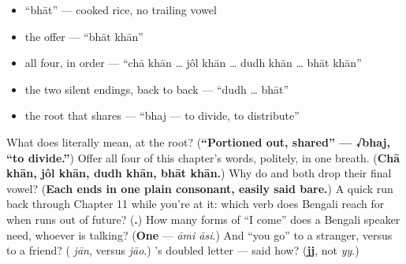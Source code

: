 \begin{itemize}
\raggedright
  \item \textquotedblleft{}bhāt\textquotedblright{} — cooked rice, no trailing vowel
  \item the offer — \textquotedblleft{}bhāt khān\textquotedblright{}
  \item all four, in order — \textquotedblleft{}chā khān … jôl khān … dudh khān … bhāt khān\textquotedblright{}
  \item the two silent endings, back to back — \textquotedblleft{}dudh … bhāt\textquotedblright{}
  \item the root that shares — \textquotedblleft{}bhaj — to divide, to distribute\textquotedblright{}
\end{itemize}

\begin{tcolorbox}[breakable,colback=teal!4,colframe=teal!35!black,title={Before you move on}]
What does  literally mean, at the root? (\textbf{\textquotedblleft{}Portioned out, shared\textquotedblright{} — √bhaj, \textquotedblleft{}to divide.\textquotedblright{}}) Offer all four of this chapter's words, politely, in one breath. (\textbf{Chā khān, jôl khān, dudh khān, bhāt khān.}) Why do  and  both drop their final vowel? (\textbf{Each ends in one plain consonant, easily said bare.}) A quick run back through Chapter 11 while you're at it: which verb does Bengali reach for when  runs out of future? (\textbf{.}) How many forms of \textquotedblleft{}I come\textquotedblright{} does a Bengali speaker need, whoever is talking? (\textbf{One} — \emph{āmi āsi}.) And \textquotedblleft{}you go\textquotedblright{} to a stranger, versus to a friend? (\textbf{} \emph{jān}, versus \textbf{} \emph{jāo}.) 's doubled letter — said how? (\textbf{jj}, not \emph{yy}.)
\end{tcolorbox}
